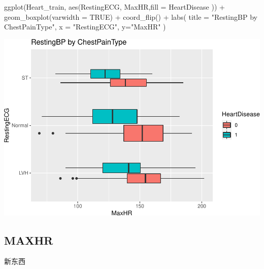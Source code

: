 \documentclass[
]{article}
\newenvironment{Shaded}{\begin{snugshade}}{\end{snugshade}}
\newcommand{\AttributeTok}[1]{\textcolor[rgb]{0.77,0.63,0.00}{#1}}
\newcommand{\ConstantTok}[1]{\textcolor[rgb]{0.00,0.00,0.00}{#1}}
\newcommand{\FunctionTok}[1]{\textcolor[rgb]{0.00,0.00,0.00}{#1}}
\newcommand{\NormalTok}[1]{#1}
\newcommand{\SpecialCharTok}[1]{\textcolor[rgb]{0.00,0.00,0.00}{#1}}
\newcommand{\StringTok}[1]{\textcolor[rgb]{0.31,0.60,0.02}{#1}}
\begin{document}
\begin{Shaded}
\begin{Highlighting}[]
\FunctionTok{ggplot}\NormalTok{(Heart\_train, }\FunctionTok{aes}\NormalTok{(RestingECG, MaxHR,}\AttributeTok{fill =}\NormalTok{ HeartDisease )) }\SpecialCharTok{+}
  \FunctionTok{geom\_boxplot}\NormalTok{(}\AttributeTok{varwidth =} \ConstantTok{TRUE}\NormalTok{) }\SpecialCharTok{+} 
  \FunctionTok{coord\_flip}\NormalTok{() }\SpecialCharTok{+}
  \FunctionTok{labs}\NormalTok{(}
    \AttributeTok{title =} \StringTok{"RestingBP by ChestPainType"}\NormalTok{,}
    \AttributeTok{x =} \StringTok{"RestingECG"}\NormalTok{,}
    \AttributeTok{y=}\StringTok{"MaxHR"}
\NormalTok{  )}
\end{Highlighting}
\end{Shaded}

\includegraphics{PSTAT-131--FINAL-PROJECT-_YIFAN-XU_files/figure-latex/unnamed-chunk-15-1.pdf}

\hypertarget{maxhr}{%
\subsection{MAXHR}\label{maxhr}}

新东西
\end{document}
